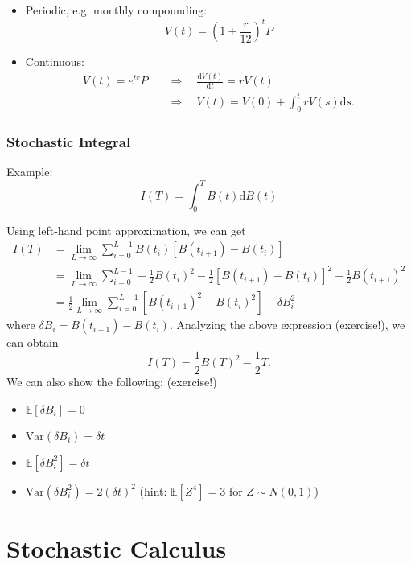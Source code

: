 \documentclass[twocolumn,landscape,10pt]{article}
\theoremstyle{definition}
\begin{document}
\begin{itemize}
    \item Periodic, e.g. monthly compounding:
        \[
            V(t) = {\left(1+\frac{r}{12}\right)}^{t}P
        \]
    \item Continuous:
        \begin{align*}
            V(t) = e^{tr}P
            &\quad\Longrightarrow\quad
            \frac{\mathrm{d}V(t)}{\mathrm{d}t}=rV(t) \\
            &\quad\Longrightarrow\quad
            V(t)=V(0)+\int_{0}^{t}rV(s)\mathrm{d}s.
        \end{align*}
\end{itemize}

\subsubsection{Stochastic Integral}

Example:
\[
    I(T) = \int_{0}^{T} B(t)\mathrm{d}B(t)
\]

Using left-hand point approximation, we can get
\begin{align*}
    I(T)
    &=
    \underset{L\rightarrow\infty}{\lim}\sum_{i=0}^{L-1}B(t_i)\left[B(t_{i+1})-B(t_i)\right]\\
    &= \underset{L\rightarrow\infty}{\lim}\sum_{i=0}^{L-1}
    -\frac{1}{2}B(t_i)^2-\frac{1}{2}{[B(t_{i+1})-B(t_i)]}^{2}
    +\frac{1}{2}B(t_{i+1})^2 \\
    &= \frac{1}{2}\underset{L\rightarrow\infty}{\lim}\sum_{i=0}^{L-1}
    [B(t_{i+1})^2-B(t_i)^2]-\delta B_i^2
\end{align*}
where $\delta B_i=B(t_{i+1})-B(t_i)$. Analyzing the above expression
(exercise!), we can obtain
\[
    I(T) = \frac{1}{2}B(T)^2 - \frac{1}{2}T.
\]
We can also show the following: (exercise!)
\begin{itemize}
    \item $\mathbb{E}[\delta B_i]=0$
    \item $\text{Var}(\delta B_i) = \delta t$
    \item $\mathbb{E}[\delta B_i^2]=\delta t$
    \item $\text{Var}(\delta B_i^2) = 2{(\delta t)}^{2}$\quad
        (hint: $\mathbb{E}[Z^4]=3$ for $Z\sim N(0,1)$)
\end{itemize}

\section{Stochastic Calculus}
\end{document}
